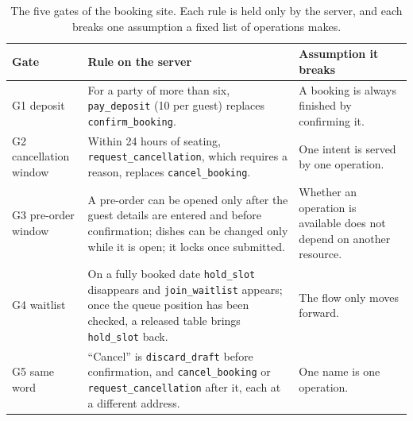 \begin{table}[htbp]
\centering
\caption{The five gates of the booking site. Each rule is held only by the server, and each breaks one assumption a fixed list of operations makes.}
\label{tab:impl:gates}
\renewcommand{\arraystretch}{1.3}
\begin{tabularx}{\textwidth}{P{0.16\textwidth}LL}
\hline
Gate & Rule on the server & Assumption it breaks \\
\hline
G1 deposit & For a party of more than six, \texttt{pay\_deposit} (\texteuro{}10 per guest) replaces \texttt{confirm\_booking}. & A booking is always finished by confirming it. \\
\hline
G2 cancellation window & Within 24 hours of seating, \texttt{request\_cancellation}, which requires a reason, replaces \texttt{cancel\_booking}. & One intent is served by one operation. \\
\hline
G3 pre-order window & A pre-order can be opened only after the guest details are entered and before confirmation; dishes can be changed only while it is open; it locks once submitted. & Whether an operation is available does not depend on another resource. \\
\hline
G4 waitlist & On a fully booked date \texttt{hold\_slot} disappears and \texttt{join\_waitlist} appears; once the queue position has been checked, a released table brings \texttt{hold\_slot} back. & The flow only moves forward. \\
\hline
G5 same word & ``Cancel'' is \texttt{discard\_draft} before confirmation, and \texttt{cancel\_booking} or \texttt{request\_cancellation} after it, each at a different address. & One name is one operation. \\
\hline
\end{tabularx}
\end{table}

